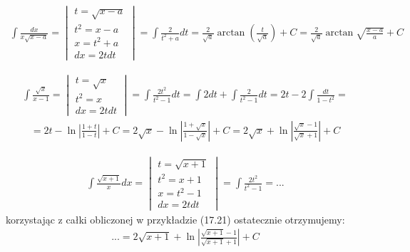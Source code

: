 

\begin{gather*}\int \frac{dx}{x\sqrt{x-a}} = \begin{vmatrix}
t=\sqrt{x-a} \\
t^2=x-a \\
x=t^2+a \\
dx=2tdt
\end{vmatrix} = \int \frac{2}{t^2+a}dt = \frac{2}{\sqrt{a}}\arctan \left( \frac{t}{\sqrt{a}} \right) +C = \frac{2}{\sqrt{a}}\arctan \sqrt{\frac{x-a}{a}} +C \end{gather*}



\begin{gather*}\int \frac{\sqrt{x}}{x-1} = \begin{vmatrix}
t=\sqrt{x} \\
t^2=x \\
dx=2tdt
\end{vmatrix} = \int \frac{2t^2}{t^2-1}dt = \int 2dt + \int \frac{2}{t^2-1}dt = 2t - 2\int \frac{dt}{1-t^2} = \end{gather*}
\begin{gather*}= 2t - \ln\left|\frac{1+t}{1-t}\right|+C = 2\sqrt{x} - \ln\left|\frac{1+\sqrt{x}}{1-\sqrt{x}}\right|+C = 2\sqrt{x}+\ln\left|\frac{\sqrt{x}-1}{\sqrt{x}+1}\right|+C\end{gather*}



\begin{gather*}\int \frac{\sqrt{x+1}}{x}dx = \begin{vmatrix}
t=\sqrt{x+1} \\
t^2=x+1 \\
x=t^2-1 \\
dx=2tdt
\end{vmatrix} = \int \frac{2t^2}{t^2-1}=...\end{gather*}
korzystając z całki obliczonej w przykładzie (17.21) ostatecznie otrzymujemy:
\begin{gather*} \nonumber ...=2\sqrt{x+1}+\ln\left|\frac{\sqrt{x+1}-1}{\sqrt{x+1}+1}\right|+C\end{gather*}


